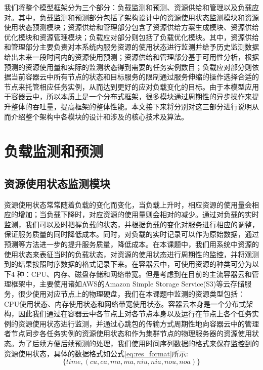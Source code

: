 我们将整个模型框架分为三个部分：负载监测和预测、资源供给和管理以及负载应对。其中，负载监测和预测部分包括了架构设计中的资源使用状态监测模块和资源使用状态预测模块；资源供给和管理部分包含了资源供给方案生成模块、资源供给优化模块和资源管理模块；负载应对部分则包括了负载优化模块。其中，资源供给和管理部分主要负责对本系统内服务资源的使用状态进行监测并给予历史监测数据给出未来一段时间内的资源使用预测；资源供给和管理部分基于可用性分析，根据预测的资源使用量和实际的监测状态得到需要的任务实例数目；负载应对部分则依据当前容器云中所有节点的状态和目标服务的限制通过服务伸缩的操作选择合适的节点来托管相应任务实例，从而达到更好的应对负载变化的目标。由于本模型应用于容器云中，所以本质上是一个分布式框架，很多模块通过周期性的异步操作来提升整体的吞吐量，提高框架的整体性能。本文接下来将分别对这三部分进行说明从而介绍整个架构中各模块的设计和涉及的核心技术及算法。

\section{负载监测和预测}
\subsection{资源使用状态监测模块}\label{sec:monitor}
资源使用状态常常随着负载的变化而变化，当负载上升时，相应资源的使用量会相应的增加；当负载下降时，对应资源的使用量则会相对的减少。通过对负载的实时监测，我们可以及时把握负载的状态，并根据负载的变化对服务进行相应的调整，保证服务质量的同时降低成本。同时，对负载的实时记录可以作为原始数据，通过预测等方法进一步的提升服务质量，降低成本。在本课题中，我们用系统中资源的使用状态来表征当时的负载状态，对资源的使用状态进行周期性的监控，并将观测到的结果按照时序数据的格式记录下来。在容器云中，可使用资源的种类可分为以下4 种：CPU、内存、磁盘存储和网络带宽。但是考虑到在目前的主流容器云和管理框架中，主要使用诸如AWS的Amazon Simple Storage Service(S3)等云存储服务，很少使用对应节点上的物理硬盘，我们在本课题中监测的资源类型包括：CPU使用状态、内存使用状态和网络带宽使用状态。容器云本身是一个分布式架构，因此我们通过在容器云中各节点上对各节点本身以及运行在节点上各个任务实例的资源使用状态进行监测，并通过心跳包的传输方式周期性地向容器云中的管理者节点同步各任务实例的资源使用状态和作为集群节点的物理服务器的资源使用状态。为了后续方便后续预测的处理，我们使用时间序列数据的格式来保存监控到的资源使用状态，具体的数据格式如公式\ref{eq:res_format}所示:
\begin{equation}\label{eq:res_format}
\{time, (cu, ca, mu, ma, niu, nia, nou, noa)\}
\end{equation}

